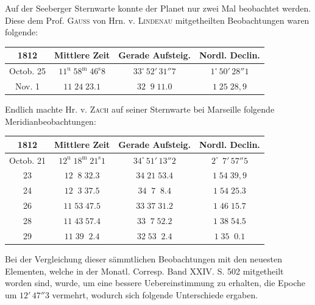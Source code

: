\par\indent Auf der Seeberger Sternwarte konnte der Planet nur zwei Mal beobachtet werden. Diese dem Prof. \textsc{Gauss}
von Hrn. v. \textsc{Lindenau} mitgetheilten Beobachtungen waren folgende:

\begin{center}
\fontsize{10}{12}\selectfont\setlength{\tabcolsep}{4pt}\renewcommand{\arraystretch}{1.15}\begin{tabular}{|c|c|c|c|}
\hline
1812 & Mittlere Zeit & Gerade Aufsteig. & Nordl. Declin. \\
\hline
Octob. 25 & $11^{\mathrm u}\;58^{\mathrm m}\;46^{\mathrm s}8$ & $33^\circ\,52'\,31''7$ & $1^\circ\,50'\,28''1$ \\
Nov. 1 & $11\;24\;23.1$ & $32\;\;9\;11.0$ & $1\;25\;28{,}9$ \\
\hline
\end{tabular}
\end{center}

\par\indent Endlich machte Hr. v. \textsc{Zach} auf seiner Sternwarte bei Marseille folgende Meridianbeobachtungen:

\begin{center}
\fontsize{10}{12}\selectfont\setlength{\tabcolsep}{4pt}\renewcommand{\arraystretch}{1.15}\begin{tabular}{|c|c|c|c|}
\hline
1812 & Mittlere Zeit & Gerade Aufsteig. & Nordl. Declin. \\
\hline
Octob. 21 & $12^{\mathrm u}\;18^{\mathrm m}\;21^{\mathrm s}1$ & $34^\circ\,51'\,13''2$ & $2^\circ\,\;7'\,57''5$ \\
23 & $12\;\;8\;32.3$ & $34\;21\;53.4$ & $1\;54\;39{,}9$ \\
24 & $12\;\;3\;37.5$ & $34\;\;7\;\;8.4$ & $1\;54\;25.3$ \\
26 & $11\;53\;47.5$ & $33\;37\;31.2$ & $1\;46\;15.7$ \\
28 & $11\;43\;57.4$ & $33\;\;7\;52.2$ & $1\;38\;54.5$ \\
29 & $11\;39\;\;2.4$ & $32\;53\;\;2.4$ & $1\;35\;\;0.1$ \\
\hline
\end{tabular}
\end{center}

\par\indent Bei der Vergleichung dieser sämmtlichen Beobachtungen mit den neuesten Elementen, welche in der
Monatl. Corresp. Band XXIV. S. 502 mitgetheilt worden sind, wurde, um eine bessere Uebereinstimmung
zu erhalten, die Epoche um $12'\,47''3$ vermehrt, wodurch sich folgende Unterschiede ergaben.

